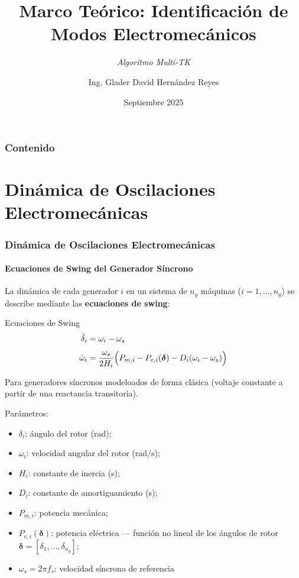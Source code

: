 \documentclass{beamer}
\title{Marco Teórico: Identificación de Modos Electromecánicos}
\subtitle{\textit{Algoritmo Multi-TK }}
\author{Ing. Glader David Hernández Reyes}
\date{Septiembre 2025}
\institute{Director: Dr. José de Jesús Nuño Ayón}
\begin{document}
\begin{frame}[plain,t]
\titlepage
\end{frame}

\begin{frame}
\frametitle{Contenido}
\tableofcontents
\end{frame}

\section{Dinámica de Oscilaciones Electromecánicas}

\begin{frame}
\frametitle{Dinámica de Oscilaciones Electromecánicas}
\framesubtitle{Ecuaciones de Swing del Generador Síncrono}

La dinámica de cada generador $i$ en un sistema de $n_g$ máquinas ($i=1,\ldots,n_g$) se describe mediante las \textbf{ecuaciones de swing}:

\begin{block}{Ecuaciones de Swing }
\begin{align}
    \dot{\delta}_i  &= \omega_i - \omega_s \label{eq:swing1} \\[4pt]
    \dot{\omega}_i  &= \frac{\omega_s}{2H_i}
                       \Bigl(P_{m,i} - P_{e,i}(\boldsymbol{\delta}) - D_i(\omega_i - \omega_s)\Bigr)
                       \label{eq:swing2}
\end{align}
\end{block}

Para generadores síncronos modeloados de forma clásica (voltaje constante a partir de una reactancia transitoria). 
\end{frame}

\begin{frame}
Parámetros: 
\vspace{0.2em}
\begin{itemize}
    \item $\delta_i$: ángulo del rotor (rad);
    \item $\omega_i$: velocidad angular del rotor (rad/s);
    \item $H_i$: constante de inercia (s); 
    \item $D_i$: constante de amortiguamiento (s);
    \item $P_{m,i}$: potencia mecánica; 
    \item $P_{e,i}(\boldsymbol{\delta})$: potencia eléctrica — función no lineal de los ángulos de rotor $\boldsymbol{\delta} = [\delta_1, \ldots, \delta_{n_g}]$;
    \item $\omega_s = 2\pi f_s$: velocidad síncrona de referencia
\end{itemize}
\end{frame}
\end{document}
